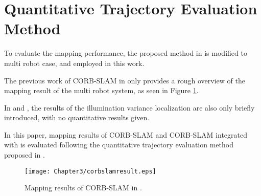 \section{Quantitative Trajectory Evaluation Method}
To evaluate the mapping performance, the proposed method in \cite{zhang2018tutorial} is modified to multi robot case, and employed in this work.

The previous work of CORB-SLAM in \cite{li2017corb} only provides a rough overview of the mapping result of the multi robot system, as seen in Figure \ref{fig:corbslamresult}.

In \cite{maddern2014illumination} and \cite{arroyo2016openable}, the results of the illumination variance localization are also only briefly introduced, with no quantitative results given.

 In this paper, mapping results of CORB-SLAM and CORB-SLAM integrated with  is evaluated following the quantitative trajectory evaluation method proposed in \cite{zhang2018tutorial}.
 
\begin{figure}[H]
	\centering
	\texttt{[image: Chapter3/corbslamresult.eps]}
	\caption{Mapping results of CORB-SLAM in \cite{li2017corb}.}
	\label{fig:corbslamresult} 
\end{figure}



\newpage
